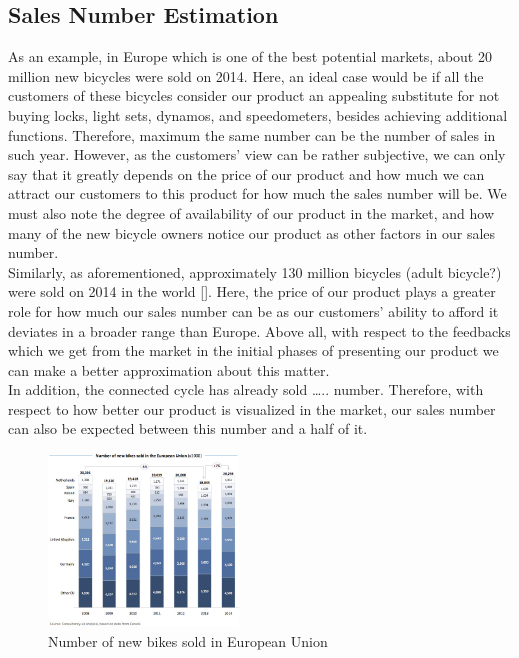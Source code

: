 \documentclass{article}
\begin{document}
	
	\subsection{Sales Number Estimation}
	As an example, in Europe which is one of the best potential markets, about 20 million new bicycles were sold on 2014. Here, an ideal case would be if all the customers of these bicycles consider our product an appealing substitute for not buying locks, light sets, dynamos, and speedometers, besides achieving additional functions. Therefore, maximum the same number can be the number of sales in such year. However, as the customers’ view can be rather subjective, we can only say that it greatly depends on the price of our product and how much we can attract our customers to this product for how much the sales number will be. We must also note the degree of availability of our product in the market, and how many of the new bicycle owners notice our product as other factors in our sales number. \\ 
	Similarly, as aforementioned, approximately 130 million bicycles (adult bicycle?) were sold on 2014 in the world []. Here, the price of our product plays a greater role for how much our sales number can be as our customers’ ability to afford it deviates in a broader range than Europe. Above all, with respect to the feedbacks which we get from the market in the initial phases of presenting our product we can make a better approximation about this matter. \\
	In addition, the connected cycle has already sold ….. number. Therefore, with respect to how better our product is visualized in the market, our sales number can also be expected between this number and a half of it.
	
	\begin{figure}[h!]
		\begin{center}
			\includegraphics[width=0.45\textwidth]{3_3_new_bikes.jpg} %
			\caption{Number of new bikes sold in European Union}
		\end{center}
	\end{figure}
	
\end{document}
